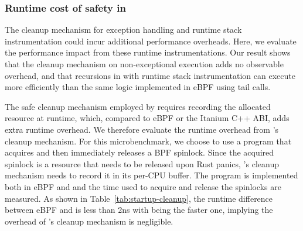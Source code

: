 \subsubsection{Runtime cost of safety in \projname{}}
The cleanup mechanism for exception handling and runtime stack instrumentation
    could incur additional performance overheads.
Here, we evaluate the performance impact from these runtime instrumentations.
Our result shows that the cleanup mechanism on non-exceptional execution adds
    no observable overhead, and that recursions in \projname{} with runtime
    stack instrumentation can execute more efficiently than the same logic
    implemented in eBPF using tail calls.

The safe cleanup mechanism employed by \projname{} requires recording the allocated
    resource at runtime, which, compared to eBPF or the Itanium C++ ABI, adds
    extra runtime overhead.
We therefore evaluate the runtime overhead from \projname{}'s cleanup
    mechanism.
For this microbenchmark, we choose to use a program that acquires and then
    immediately releases a BPF spinlock.
Since the acquired spinlock is a resource that needs to be released upon Rust
    panics, \projname{}'s cleanup mechanism needs to record it in its per-CPU
    buffer.
The program is implemented both in eBPF and \projname{} and the time used to
    acquire and release the spinlocks are measured.
As shown in Table~\ref{tab:startup-cleanup}, the runtime difference between
    eBPF and \projname{} is less than 2ns with \projname{} being the faster
    one, implying the overhead of \projname{}'s cleanup mechanism is
    negligible.

